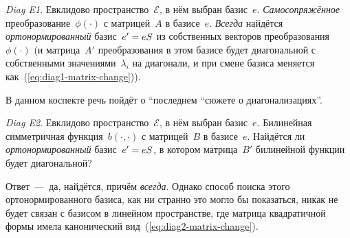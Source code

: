 \documentclass[a4paper,12pt]{article}
\theoremstyle{remark}
\begin{document}
  \smallskip
  
  \emph{Diag E1}.
  Евклидово пространство~$\mathcal E$, в нём выбран базис~$e$.
  \emph{Самосопряжённое} преобразование~$\phi(\cdot)$ с матрицей~$A$ в базисе~$e$.
  \emph{Всегда} найдётся \emph{ортонормированный} базис~$e' \hm= e S$ из собственных векторов преобразования~$\phi(\cdot)$ (и матрица~$A'$ преобразования в этом базисе будет диагональной с собственными значениями~$\lambda_i$ на диагонали, и при смене базиса меняется как~(\ref{eq:diag1-matrix-change})).
  
  \smallskip
  
  В данном коспекте речь пойдёт о ``последнем ``сюжете о диагонализациях''.
  
  \smallskip
  
  \emph{Diag E2}.
  Евклидово пространство~$\mathcal E$, в нём выбран базис~$e$.
  Билинейная симметричная функция~$b(\cdot, \cdot)$ с матрицей~$B$ в базисе~$e$.
  Найдётся ли \emph{ортонормированный} базис~$e' \hm= e S$, в котором матрица~$B'$ билинейной функции будет диагональной?
  
  Ответ~---~да, найдётся, причём \emph{всегда}.
  Однако способ поиска этого ортонормированного базиса, как ни странно это могло бы показаться, никак не будет связан с базисом в линейном пространстве, где матрица квадратичной формы имела канонический вид~(\ref{eq:diag2-matrix-change}).
  
\end{document}
